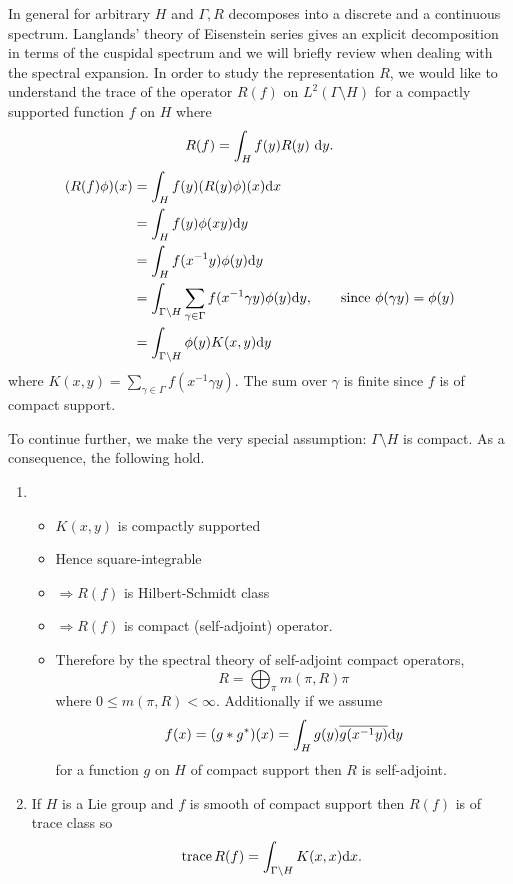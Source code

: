 \documentclass[11pt]{amsart}
\def\d{\text d}
\def\bs{\setminus}
\def\Ltwo{L^2}
\def\trace{\operatorname{trace}}
\theoremstyle{remark}
\begin{document}
In general for arbitrary $H$ and $\Gamma, R$ decomposes into a discrete and a continuous spectrum. Langlands' theory of Eisenstein series gives an explicit decomposition in terms of the cuspidal spectrum and we will briefly review when dealing with the spectral expansion. In order to study the representation $R$, we would like to understand the trace of the operator $R(f)$ on $\Ltwo(\Gamma\bs H)$ for a compactly supported function $f$ on $H$ where
\[ R(f) = \int_H f(y) R(y)\ \d y. \]
\begin{align*}
	(R(f)\phi)(x) & = \int_H f(y) (R(y)\phi)(x) \d x \\
			& = \int_H f(y) \phi(xy) \d y \\
			& = \int_H f(x^{-1} y) \phi(y) \d y \\
			& = \int_{\Gamma\bs H} \sum_{\gamma \in \Gamma} f(x^{-1}\gamma y) \phi(y) \d y, \qquad \text{since } \phi(\gamma y) = \phi(y)\\
			& = \int_{\Gamma\bs H} \phi(y) K(x, y) \d y
\end{align*}
where $K(x, y) = \sum_{\gamma \in \Gamma} f(x^{-1}\gamma y)$. The sum over $\gamma$ is finite since $f$ is of compact support. 

To continue further, we make the very special assumption: $\Gamma\bs H$ is compact. As a consequence, the following hold.
\begin{enumerate}
\item 	\begin{itemize}
		\item[] $K(x, y)$ is compactly supported 
		\item[] Hence square-integrable
		\item[] $\Rightarrow R(f)$ is Hilbert-Schmidt class
		\item[] $\Rightarrow R(f)$ is compact (self-adjoint) operator. 
		\item[] Therefore by the spectral theory of self-adjoint compact operators,
			\[ R = \bigoplus_\pi m(\pi, R) \pi \]
			where $0 \leq m(\pi, R) < \infty$. Additionally if we assume 
			\[ f(x) = (g*g^*)(x) = \int_H g(y) \overline{g(x^{-1}y)} \d y\]
			for a function $g$ on $H$ of compact support then $R$ is self-adjoint. 
		\end{itemize}
\item If $H$ is a Lie group and $f$ is smooth of compact support then $R(f)$ is of trace class so
	\[ \trace R(f) = \int_{\Gamma\bs H} K(x, x) \d x. \]
\end{enumerate}
\end{document}
